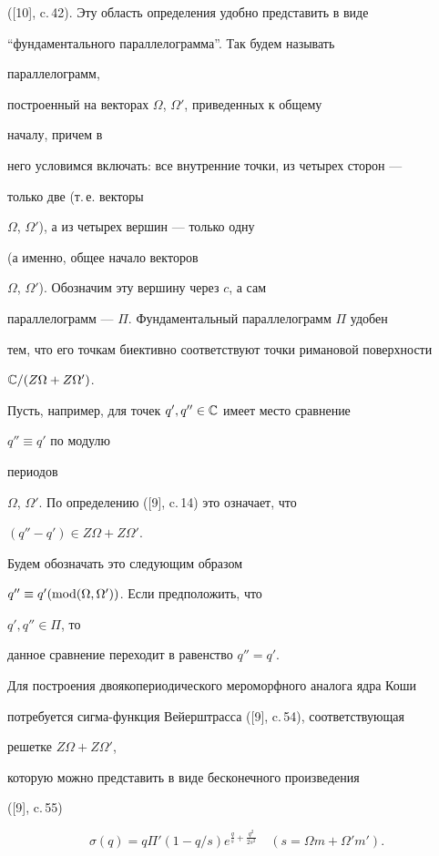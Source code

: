 ([10], c.\,42). Эту область определения удобно представить в виде 


``фундаментального параллелограмма''. Так будем называть 


параллелограмм, 


построенный на векторах $\Omega$, $\Omega'$, приведенных к общему 


началу, причем в 


него условимся включать: все внутренние точки, из четырех сторон --- 


только две (т.\,е. векторы 


$\Omega$, $\Omega'$), а из четырех вершин --- только одну 


(а именно, общее начало векторов 


$\Omega$, $\Omega'$). Обозначим эту вершину через $c$, а сам 


параллелограмм --- $\Pi$. Фундаментальный параллелограмм $\Pi$ удобен 


тем, что его точкам биективно соответствуют точки римановой поверхности 


$\Bbb C/(Z\Omega+Z\Omega')$. 


 


Пусть, например, для точек $q',q''\in\Bbb C$ имеет место сравнение 


$q''\equiv q'$ по модулю 


периодов 


$\Omega$, $\Omega'$. По определению ([9], c.\,14) это означает, что 


$(q''-q')\in Z\Omega+Z\Omega'$. 


Будем обозначать это следующим образом 


$q''\equiv q'(\operatorname{mod}(\Omega,\Omega'))$. Если предположить, что 


$q',q''\in\Pi$, то 


данное сравнение переходит в равенство $q''=q'$. 


 


Для построения двоякопериодического мероморфного аналога ядра Коши 


потребуется сигма-функция Вейерштрасса ([9], c.\,54), соответствующая 


решетке $Z\Omega+Z\Omega'$, 


которую можно представить в виде бесконечного произведения 


([9], c.\,55)


\begin{equation} 


\sigma(q)=q\Pi'(1-q/s)e^{\frac{q}{s}+\frac{q^2}{2s^2}}\quad 


(s=\Omega m+\Omega' m'). 


\end{equation} 


